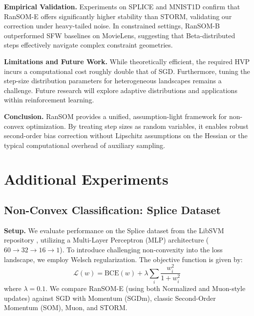 \documentclass{article}
\theoremstyle{plain}
\theoremstyle{definition}
\theoremstyle{remark}
\begin{document}
\textbf{Empirical Validation.} Experiments on SPLICE and MNIST1D confirm that RanSOM-E offers significantly higher stability than STORM, validating our correction under heavy-tailed noise. In constrained settings, RanSOM-B outperformed SFW baselines on MovieLens, suggesting that Beta-distributed steps effectively navigate complex constraint geometries.

\textbf{Limitations and Future Work.} While theoretically efficient, the required HVP incurs a computational cost roughly double that of SGD. Furthermore, tuning the step-size distribution parameters for heterogeneous landscapes remains a challenge. Future research will explore adaptive distributions and applications within reinforcement learning.

\textbf{Conclusion.} RanSOM provides a unified, assumption-light framework for non-convex optimization. By treating step sizes as random variables, it enables robust second-order bias correction without Lipschitz assumptions on the Hessian or the typical computational overhead of auxiliary sampling.






\newpage
\onecolumn
\appendix


\section{Additional Experiments}\label{sec:AppExp}
\subsection{Non-Convex Classification: Splice Dataset}

\textbf{Setup.} We evaluate performance on the Splice dataset from the LibSVM repository \cite{libsvm}, utilizing a Multi-Layer Perceptron (MLP) architecture ($60 \to 32 \to 16 \to 1$). To introduce challenging non-convexity into the loss landscape, we employ Welsch regularization. The objective function is given by:
\[
\mathcal{L}(w) = \text{BCE}(w) + \lambda \sum_{i} \frac{w_i^2}{1 + w_i^2}
\]
where $\lambda=0.1$. We compare RanSOM-E (using both Normalized and Muon-style updates) against SGD with Momentum (SGDm), classic Second-Order Momentum (SOM), Muon, and STORM.
\end{document}
